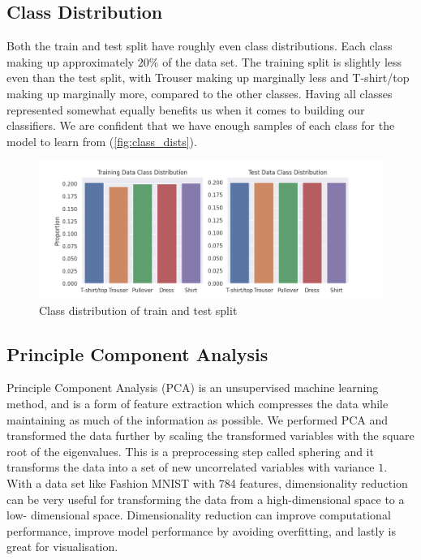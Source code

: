 \documentclass[../main.tex]{subfiles}
\begin{document}
\subsection{Class Distribution}

Both the train and test split have roughly even class 
distributions. Each class making up approximately $20\%$ of the 
data set. 
The training split is slightly less even than the test split, 
with Trouser making up marginally less and T-shirt/top making up 
marginally more, compared to the other classes. Having all 
classes represented somewhat equally benefits us when it comes to 
building our classifiers. We are confident that we have enough 
samples of each class for the model to learn from 
(\autoref{fig:class_dists}). 

\begin{figure}[ht]
    \centering
    \includegraphics[width=\textwidth]{images/class_distribution .png}
    \caption{Class distribution of train and test split}
    \label{fig:class_dists}
\end{figure}


\subsection{Principle Component Analysis}

Principle Component Analysis (PCA) is an unsupervised machine 
learning method, and is a form of feature extraction which 
compresses the data while maintaining as much of the information 
as possible. We performed PCA and transformed the data further by 
scaling the transformed variables with the square root of the 
eigenvalues. This is a preprocessing step called sphering and it 
transforms the data into a set of new uncorrelated variables with 
variance $1$. With a data set like Fashion MNIST with 784 
features, dimensionality reduction can be very useful for 
transforming the data from a high-dimensional space to a low-
dimensional space.
Dimensionality reduction can improve computational performance, 
improve model performance by avoiding overfitting, and lastly is 
great for visualisation. 
\end{document}
